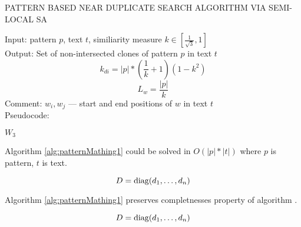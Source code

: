 \begin{algorithm}[H]
\caption{PATTERN BASED NEAR DUPLICATE
SEARCH ALGORITHM VIA SEMI-LOCAL SA}
\label{alg:patternMathing1}
Input: pattern $p$, text $t$, similiarity measure $k \in  [ \frac{1}{\sqrt{3}} ,1  ]$\\
Output: Set of non-intersected clones of pattern $p$ in text $t$
\begin{equation}
    k_{di}=|p|*(\frac{1}{k}+1)(1-k^2)
\end{equation}
\begin{equation}
 L_{w} = \frac{|p|} {k}
\end{equation}
Comment: $w_{i},w_{j}$ --- start and end positions of $w$ in text $t$ \\
Pseudocode:
\begin{algorithmic}[1]
   \ENDIF
   \ENDIF
\ENDFOR
{}
\ENDIF

\ENDFOR
\RETURN $W_3$

\end{algorithmic}
\end{algorithm}


\begin{theorem}
Algorithm \ref{alg:patternMathing1} could  be solved in $ O(|p| * |t| )$ where $p$ is pattern, $t$ is text.

\begin{displaymath}
    D = \operatorname{diag}(d_1,\dots,d_n)
  \end{displaymath}
\end{theorem}

\begin{theorem}
Algorithm \ref{alg:patternMathing1} preserves completnesses property of algorithm \cite{luciv2019interactive}.

\begin{displaymath}
    D = \operatorname{diag}(d_1,\dots,d_n)
  \end{displaymath}
\end{theorem}
